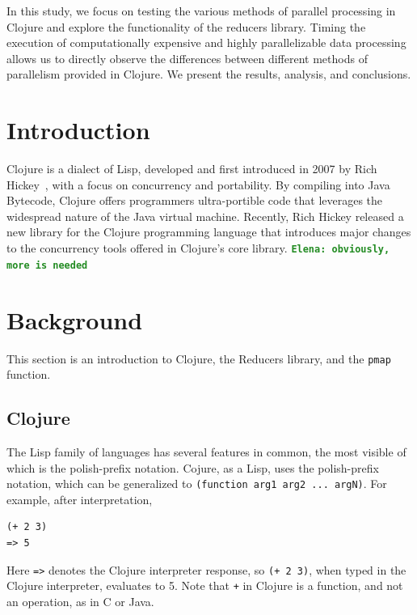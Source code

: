 \documentclass[12pt]{article}
\newcommand{\comment}[1]{{\bf \tt  {#1}}}
\newcommand{\emcomment}[1]{\textcolor{ForestGreen}{\comment{Elena: {#1}}}}
\newcommand{\clocode}[1]{{\texttt {#1}}}
\begin{document}
In this study, we focus on testing the various methods of parallel processing in Clojure and explore the functionality of the reducers library. Timing the execution of computationally expensive and highly parallelizable data processing allows us to directly observe the differences between different methods of parallelism provided in Clojure. We present the results, analysis, and conclusions.


 \newpage

\setcounter{page}{1}


\section{Introduction}\label{sec:intro}

	 Clojure is a dialect of Lisp, developed and first introduced in 2007 by Rich Hickey~\cite{Hickey:2008}, with a focus on concurrency and portability. By compiling into Java Bytecode, Clojure offers programmers ultra-portible code that leverages the widespread nature of the Java virtual machine. 
Recently, Rich Hickey released a new library for the Clojure programming language that introduces major changes to the concurrency tools offered in Clojure's core library.
\emcomment{obviously, more is needed}

\section{Background}\label{sec:background}
This section is an introduction to Clojure, the Reducers library, and the \clocode{pmap} function. 
\subsection{Clojure}\label{sec:clojure}
The Lisp family of languages has several features in common, the most visible of which is the polish-prefix notation. Cojure, as a Lisp, uses the polish-prefix notation, which can be generalized to \clocode{(function arg1 arg2 ... argN)}. For example, after interpretation, 
\begin{verbatim}
(+ 2 3)
=> 5
\end{verbatim}
Here \clocode{=>} denotes the Clojure interpreter response, so \clocode{(+ 2 3)}, when typed in the Clojure interpreter, evaluates to 5. 
Note that \clocode{+} in Clojure is a function, and not an operation, as in C or Java. 
\end{document}
